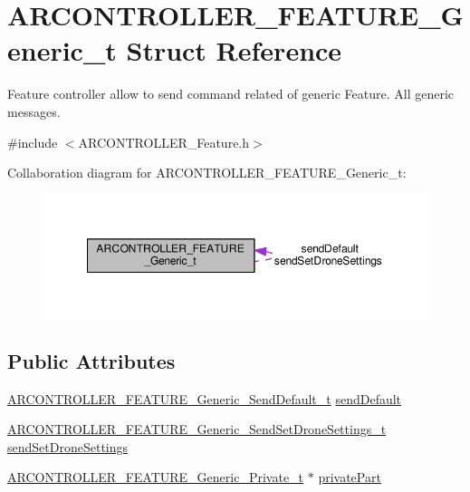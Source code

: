 \hypertarget{struct_a_r_c_o_n_t_r_o_l_l_e_r___f_e_a_t_u_r_e___generic__t}{}\section{A\+R\+C\+O\+N\+T\+R\+O\+L\+L\+E\+R\+\_\+\+F\+E\+A\+T\+U\+R\+E\+\_\+\+Generic\+\_\+t Struct Reference}
\label{struct_a_r_c_o_n_t_r_o_l_l_e_r___f_e_a_t_u_r_e___generic__t}


Feature controller allow to send command related of generic Feature. All generic messages.  




{\ttfamily \#include $<$A\+R\+C\+O\+N\+T\+R\+O\+L\+L\+E\+R\+\_\+\+Feature.\+h$>$}



Collaboration diagram for A\+R\+C\+O\+N\+T\+R\+O\+L\+L\+E\+R\+\_\+\+F\+E\+A\+T\+U\+R\+E\+\_\+\+Generic\+\_\+t\+:
\nopagebreak
\begin{figure}[H]
\begin{center}
\leavevmode
\includegraphics[width=349pt]{struct_a_r_c_o_n_t_r_o_l_l_e_r___f_e_a_t_u_r_e___generic__t__coll__graph}
\end{center}
\end{figure}
\subsection*{Public Attributes}
\begin{DoxyCompactItemize}
\item 
\hyperlink{_a_r_c_o_n_t_r_o_l_l_e_r___feature_8h_aad35ddc5f53bb08511a1383d3282023b}{A\+R\+C\+O\+N\+T\+R\+O\+L\+L\+E\+R\+\_\+\+F\+E\+A\+T\+U\+R\+E\+\_\+\+Generic\+\_\+\+Send\+Default\+\_\+t} \hyperlink{struct_a_r_c_o_n_t_r_o_l_l_e_r___f_e_a_t_u_r_e___generic__t_add597d716b59bf0a0e0efcca17d15be0}{send\+Default}
\item 
\hyperlink{_a_r_c_o_n_t_r_o_l_l_e_r___feature_8h_a2ae46b2f69f7d31a3d70dbe6b0cbe241}{A\+R\+C\+O\+N\+T\+R\+O\+L\+L\+E\+R\+\_\+\+F\+E\+A\+T\+U\+R\+E\+\_\+\+Generic\+\_\+\+Send\+Set\+Drone\+Settings\+\_\+t} \hyperlink{struct_a_r_c_o_n_t_r_o_l_l_e_r___f_e_a_t_u_r_e___generic__t_abc89c7f418dc67f7c088c9f8f93571cd}{send\+Set\+Drone\+Settings}
\item 
\hyperlink{_a_r_c_o_n_t_r_o_l_l_e_r___feature_8h_a5b3f17a93729363eec0b10d1c0758206}{A\+R\+C\+O\+N\+T\+R\+O\+L\+L\+E\+R\+\_\+\+F\+E\+A\+T\+U\+R\+E\+\_\+\+Generic\+\_\+\+Private\+\_\+t} $\ast$ \hyperlink{struct_a_r_c_o_n_t_r_o_l_l_e_r___f_e_a_t_u_r_e___generic__t_a58c815132b3c25f1c936f952866d3df5}{private\+Part}
\end{DoxyCompactItemize}


